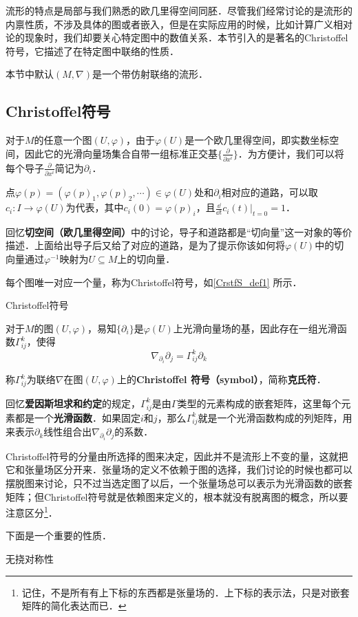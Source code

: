 

流形的特点是局部与我们熟悉的欧几里得空间同胚．尽管我们经常讨论的是流形的内禀性质，不涉及具体的图或者嵌入，但是在实际应用的时候，比如计算广义相对论的现象时，我们却要关心特定图中的数值关系．本节引入的是著名的Christoffel符号，它描述了在特定图中联络的性质．

本节中默认$(M, \nabla)$是一个带仿射联络的流形．


\subsection{Christoffel符号}

对于$M$的任意一个图$(U, \varphi)$，由于$\varphi(U)$是一个欧几里得空间，即实数坐标空间，因此它的光滑向量场集合自带一组标准正交基$\{\frac{\partial}{\partial x^i}\}$．为方便计，我们可以将每个导子$\frac{\partial}{\partial x^i}$简记为$\partial_i$．

点$\varphi(p)=(\varphi(p)_1, \varphi(p)_2, \cdots)\in\varphi(U)$处和$\partial_i$相对应的道路，可以取$c_i:I\to \varphi(U)$为代表，其中$c_i(0)=\varphi(p)_i$，且$\frac{\dd}{\dd t}c_i(t)|_{t=0}=1$．

回忆\textbf{切空间（欧几里得空间）}中的讨论，导子和道路都是“切向量”这一对象的等价描述．上面给出导子后又给了对应的道路，是为了提示你该如何将$\varphi(U)$中的切向量通过$\varphi^{-1}$映射为$U\subseteq M$上的切向量．

每个图唯一对应一个量，称为Christoffel符号，如\autoref{CrstfS_def1} 所示．

\begin{definition}{Christoffel符号}\label{CrstfS_def1}

对于$M$的图$(U, \varphi)$，易知$\{\partial_i\}$是$\varphi(U)$上光滑向量场的基，因此存在一组光滑函数$\Gamma^k_{ij}$，使得
\begin{equation}
\nabla_{\partial_i}\partial_j=\Gamma^k_{ij}\partial_k
\end{equation}

称$\Gamma^k_{ij}$为联络$\nabla$在图$(U, \varphi)$上的\textbf{Christoffel 符号（symbol）}，简称\textbf{克氏符}．
\end{definition}

回忆\textbf{爱因斯坦求和约定}的规定，$\Gamma^k_{ij}$是由$\Gamma$类型的元素构成的嵌套矩阵，这里每个元素都是一个\textbf{光滑函数}．如果固定$i$和$j$，那么$\Gamma^k_{ij}$就是一个光滑函数构成的列矩阵，用来表示$\partial_k$线性组合出$\nabla_{\partial_i}\partial_j$的系数．

Christoffel符号的分量由所选择的图来决定，因此并不是流形上不变的量，这就把它和张量场区分开来．张量场的定义不依赖于图的选择，我们讨论的时候也都可以摆脱图来讨论，只不过当选定图了以后，一个张量场总可以表示为光滑函数的嵌套矩阵；但Christoffel符号就是依赖图来定义的，根本就没有脱离图的概念，所以要注意区分\footnote{记住，不是所有有上下标的东西都是张量场的．上下标的表示法，只是对嵌套矩阵的简化表达而已．}．


下面是一个重要的性质．

\begin{theorem}{无挠对称性}

\end{theorem}













